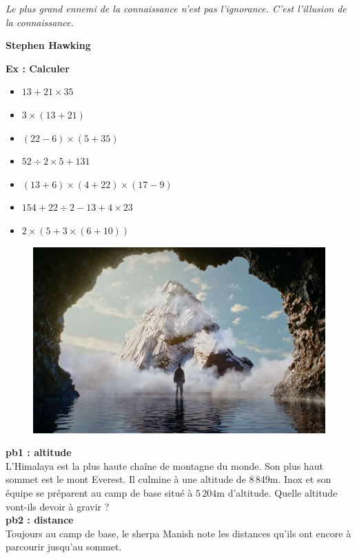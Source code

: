 



\begin{center}
  \textit{Le plus grand ennemi de la connaissance n'est pas l'ignorance. C'est l'illusion de la connaissance.} 
  
  \textbf{Stephen Hawking}
\end{center}

\textbf{Ex : Calculer} 

\begin{multicols}{2} \begin{itemize}[label={$\bullet$}]
  \item $13 + 21 \times 35$ 
  \item $3 \times (13 + 21)$ 
  \item $(22 - 6) \times (5 + 35)$
  \item $52 \div 2 \times 5 + 131$
  \item $(13 + 6) \times (4 + 22) \times (17 - 9)$
  \item $154 + 22 \div 2 - 13 + 4 \times 23$
  \item $2 \times ( 5 + 3 \times (6 + 10))$
\end{itemize} \end{multicols}


\begin{figure}[H]
  \centering
  \includegraphics[width=0.4\linewidth]{5x1-calcul-numerique/kaizen.jpg}
\end{figure}

\textbf{pb1 : altitude} \\

L'Himalaya est la plus haute chaîne de montagne du monde. Son plus haut sommet est le mont Everest. Il culmine à une altitude de $8\,849$m. Inox et son équipe se préparent au camp de base situé à $5\,204$m d'altitude. Quelle altitude vont-ils devoir à gravir ? \\


\textbf{pb2 : distance} \\
 
Toujours au camp de base, le sherpa Manish note les distances qu'ils ont encore à parcourir jusqu'au sommet. 

